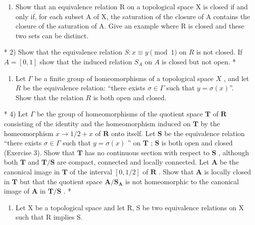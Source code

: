 \begin{enumerate}
\def\labelenumi{\alph{enumi})}
\setcounter{enumi}{1}
\tightlist
\item
  Show that an equivalence relation R on a topological space X is closed if and only if, for each subset A of X, the saturation of the closure of A contains the closure of the saturation of A. Give an example where R is closed and these two sets can be distinct.
\end{enumerate}

* 2) Show that the equivalence relation \(S: x \equiv y \pmod{1}\) on \(R\) is not closed. If \(A = [0,1]\) show that the induced relation \(S_A\) on \(A\) is closed but not open. *

\begin{enumerate}
\def\labelenumi{\arabic{enumi})}
\setcounter{enumi}{2}
\tightlist
\item
  Let \(\Gamma\) be a finite group of homeomorphisms of a topological space \(X\) , and let \(R\) be the equivalence relation: ``there exists \(\sigma \in \Gamma\) such that \(y = \sigma(x)\)''. Show that the relation \(R\) is both open and closed.
\end{enumerate}

* 4) Let \(\Gamma\) be the group of homeomorphisms of the quotient space \(\mathbf{T}\) of \(\mathbf{R}\) consisting of the identity and the homeomorphism induced on \(\mathbf{T}\) by the homeomorphism \(x \to 1/2 + x\) of \(\mathbf{R}\) onto itself. Let \(\mathbf{S}\) be the equivalence relation ``there exists \(\sigma \in \Gamma\) such that \(y = \sigma(x)\) '' on \(\mathbf{T}\) ; \(\mathbf{S}\) is both open and closed (Exercise 3). Show that \(\mathbf{T}\) has no continuous section with respect to \(\mathbf{S}\) , although both \(\mathbf{T}\) and \(\mathbf{T}/\mathbf{S}\) are compact, connected and locally connected. Let \(\mathbf{A}\) be the canonical image in \(\mathbf{T}\) of the interval \([0,1/2]\) of \(\mathbf{R}\) . Show that \(\mathbf{A}\) is locally closed in \(\mathbf{T}\) but that the quotient space \(\mathbf{A}/\mathbf{S}_{\mathbf{A}}\) is not homeomorphic to the canonical image of \(\mathbf{A}\) in \(\mathbf{T}/\mathbf{S}\) . *

\begin{enumerate}
\def\labelenumi{\arabic{enumi})}
\setcounter{enumi}{4}
\tightlist
\item
  Let X be a topological space and let R, S be two equivalence relations on X such that R implies S.
\end{enumerate}


